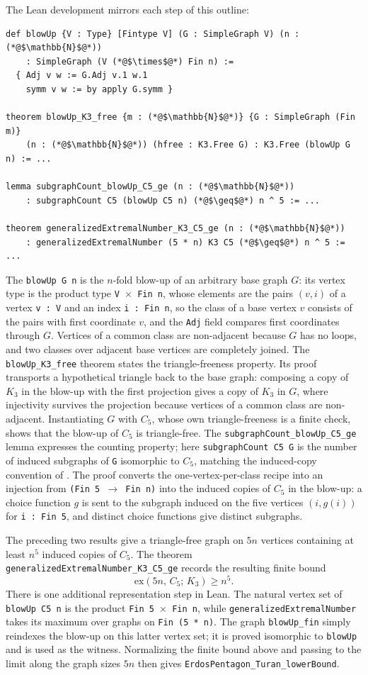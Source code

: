 \documentclass{article}
\newcommand{\lean}[1]{\texttt{#1}}
\begin{document}
The Lean development mirrors each step of this outline:
\begin{lstlisting}
def blowUp {V : Type} [Fintype V] (G : SimpleGraph V) (n : (*@$\mathbb{N}$@*))
    : SimpleGraph (V (*@$\times$@*) Fin n) :=
  { Adj v w := G.Adj v.1 w.1
    symm v w := by apply G.symm }

theorem blowUp_K3_free {m : (*@$\mathbb{N}$@*)} {G : SimpleGraph (Fin m)}
    (n : (*@$\mathbb{N}$@*)) (hfree : K3.Free G) : K3.Free (blowUp G n) := ...

lemma subgraphCount_blowUp_C5_ge (n : (*@$\mathbb{N}$@*))
    : subgraphCount C5 (blowUp C5 n) (*@$\geq$@*) n ^ 5 := ...

theorem generalizedExtremalNumber_K3_C5_ge (n : (*@$\mathbb{N}$@*))
    : generalizedExtremalNumber (5 * n) K3 C5 (*@$\geq$@*) n ^ 5 := ...
\end{lstlisting}
The \lean{blowUp G n} is the $n$-fold blow-up of an arbitrary base graph $G$: its
vertex type is the product type \lean{V $\times$ Fin n}, whose elements are
the pairs $(v,i)$ of a vertex \lean{v : V} and an index \lean{i : Fin n}, so
the class of a base vertex $v$ consists of the pairs with first coordinate
$v$, and the \lean{Adj} field compares first coordinates through $G$.
Vertices of a common class are non-adjacent because $G$ has no loops, and two
classes over adjacent base vertices are completely joined.
The \lean{blowUp\_K3\_free} theorem states the triangle-freeness property.  Its proof
transports a hypothetical triangle back to the base graph: composing a copy
of $K_3$ in the blow-up with the first projection gives a copy of $K_3$ in
$G$, where injectivity survives the projection because vertices of a common
class are non-adjacent.  Instantiating $G$ with $C_5$, whose own
triangle-freeness is a finite check, shows that the blow-up of $C_5$
is triangle-free.  The
\lean{subgraphCount\_blowUp\_C5\_ge} lemma
expresses the counting property; here
\lean{subgraphCount C5 G} is the number of induced subgraphs of \lean{G}
isomorphic to $C_5$, matching the induced-copy convention of
.  The proof converts the one-vertex-per-class recipe into an
injection from \lean{(Fin 5 $\to$ Fin n)} into the induced copies of $C_5$
in the blow-up: a choice function $g$ is sent to the subgraph induced on the five
vertices $(i, g(i))$ for \lean{i : Fin 5}, and distinct choice functions give
distinct subgraphs.

The preceding two results give a triangle-free graph on $5n$ vertices
containing at least $n^5$ induced copies of $C_5$.  The theorem
\lean{generalizedExtremalNumber\_K3\_C5\_ge} records the resulting finite bound
\[
  \mathrm{ex}(5n,\,C_5;\,K_3)\geq n^5.
\]
There is one additional representation step in Lean.  The natural vertex set
of \lean{blowUp C5 n} is the product \lean{Fin 5 $\times$ Fin n}, while
\lean{generalizedExtremalNumber} takes its maximum over graphs on
\lean{Fin (5 * n)}.  The graph \lean{blowUp\_fin} simply reindexes the blow-up
on this latter vertex set; it is proved isomorphic to \lean{blowUp} and is used
as the witness.  Normalizing the finite bound above and passing to the limit
along the graph sizes $5n$ then gives
\lean{ErdosPentagon\_Turan\_lowerBound}.
\end{document}

